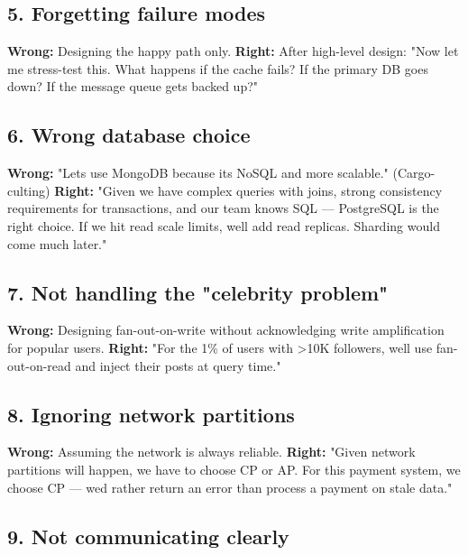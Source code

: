 \documentclass[11pt]{article}
\begin{document}
\subsection{5. Forgetting failure modes}\label{5-forgetting-failure-modes}

\textbf{Wrong:} Designing the happy path only.
\textbf{Right:} After high-level design: "Now let me stress-test this. What happens if the cache fails? If the primary DB goes down? If the message queue gets backed up?"

\subsection{6. Wrong database choice}\label{6-wrong-database-choice}

\textbf{Wrong:} "Let\textquotesingle s use MongoDB because it\textquotesingle s NoSQL and more scalable." (Cargo-culting)
\textbf{Right:} "Given we have complex queries with joins, strong consistency requirements for transactions, and our team knows SQL --- PostgreSQL is the right choice. If we hit read scale limits, we\textquotesingle ll add read replicas. Sharding would come much later."

\subsection{7. Not handling the "celebrity problem"}\label{7-not-handling-the-celebrity-problem}

\textbf{Wrong:} Designing fan-out-on-write without acknowledging write amplification for popular users.
\textbf{Right:} "For the 1\% of users with \textgreater10K followers, we\textquotesingle ll use fan-out-on-read and inject their posts at query time."

\subsection{8. Ignoring network partitions}\label{8-ignoring-network-partitions}

\textbf{Wrong:} Assuming the network is always reliable.
\textbf{Right:} "Given network partitions will happen, we have to choose CP or AP. For this payment system, we choose CP --- we\textquotesingle d rather return an error than process a payment on stale data."

\subsection{9. Not communicating clearly}\label{9-not-communicating-clearly}
\end{document}
